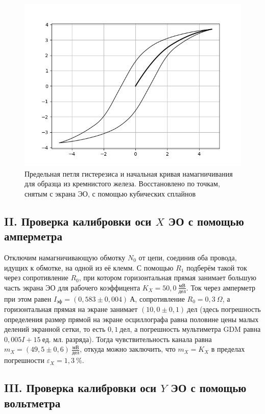 \documentclass[a4paper,10pt]{article}
\begin{document}
\begin{figure}[h]
	\centering
	\includegraphics[scale=0.75]{Loop_3}
	\caption{Предельная петля гистерезиса и начальная кривая намагничивания для образца из кремнистого железа. Восстановлено по точкам, снятым с экрана ЭО, с помощью кубических сплайнов} \label{Loop_3}
\end{figure}

\subsection*{II. Проверка калибровки оси $X$ ЭО с помощью амперметра}

Отключим намагничивающую обмотку $N_0$ от цепи, соединив оба провода, идущих к обмотке, на одной из её клемм. С помощью $R_1$ подберём такой ток через сопротивление $R_0$, при котором горизонтальная прямая занимает большую часть экрана ЭО для рабочего коэффицента $K_X=50,0~\frac{\text{мВ}}{\text{дел}}$. Ток через амперметр при этом равен $I_{\text{эф}}=\left(0,583\pm0,004\right)~\text{А}$, сопротивление $R_0=0,3~\Omega$, а горизонтальная прямая на экране занимает $\left(10,0\pm0,1\right)~\text{дел}$ (здесь погрешность определения размер прямой на экране осциллографа равна половине цены малых делений экранной сетки, то есть $0,1~\text{дел}$, а погрешность мультиметра GDM равна $0,005I+15~\text{ед. мл. разряда}$). Тогда чувствительность канала равна $m_X=\left(49,5\pm0,6\right)~\frac{\text{мВ}}{\text{дел}}$, откуда можно заключить, что $m_X=K_X$ в пределах погрешности $\varepsilon_X=1,3~\%$. 

\subsection*{III. Проверка калибровки оси $Y$ ЭО с помощью вольтметра}
\end{document}
